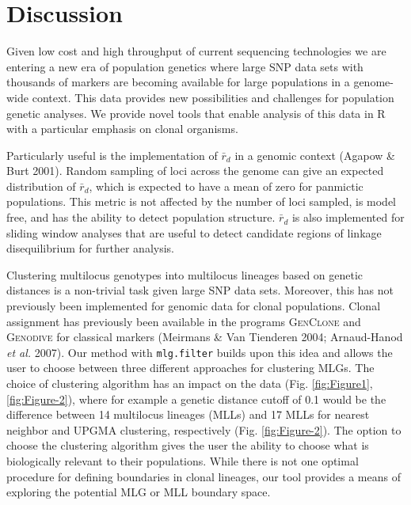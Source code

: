 \documentclass[double,12pt]{beavtex}
\begin{document}
  \section{Discussion}\label{discussion-1}
  
  Given low cost and high throughput of current sequencing technologies we
  are entering a new era of population genetics where large SNP data sets
  with thousands of markers are becoming available for large populations
  in a genome- wide context. This data provides new possibilities and
  challenges for population genetic analyses. We provide novel tools that
  enable analysis of this data in R with a particular emphasis on clonal
  organisms.
  
  Particularly useful is the implementation of \(\bar{r}_d\) in a genomic
  context (Agapow \& Burt 2001). Random sampling of loci across the genome
  can give an expected distribution of \(\bar{r}_d\), which is expected to
  have a mean of zero for panmictic populations. This metric is not
  affected by the number of loci sampled, is model free, and has the
  ability to detect population structure. \(\bar{r}_d\) is also
  implemented for sliding window analyses that are useful to detect
  candidate regions of linkage disequilibrium for further analysis.
  
  Clustering multilocus genotypes into multilocus lineages based on
  genetic distances is a non-trivial task given large SNP data sets.
  Moreover, this has not previously been implemented for genomic data for
  clonal populations. Clonal assignment has previously been available in
  the programs \textsc{GenClone} and \textsc{Genodive} for classical
  markers (Meirmans \& Van Tienderen 2004; Arnaud-Hanod \emph{et al.}
  2007). Our method with \texttt{mlg.filter} builds upon this idea and
  allows the user to choose between three different approaches for
  clustering MLGs. The choice of clustering algorithm has an impact on the
  data (Fig. \ref{fig:Figure1}, \ref{fig:Figure-2}), where for example a
  genetic distance cutoff of 0.1 would be the difference between 14
  multilocus lineages (MLLs) and 17 MLLs for nearest neighbor and UPGMA
  clustering, respectively (Fig. \ref{fig:Figure-2}). The option to choose
  the clustering algorithm gives the user the ability to choose what is
  biologically relevant to their populations. While there is not one
  optimal procedure for defining boundaries in clonal lineages, our tool
  provides a means of exploring the potential MLG or MLL boundary space.
  
\end{document}
